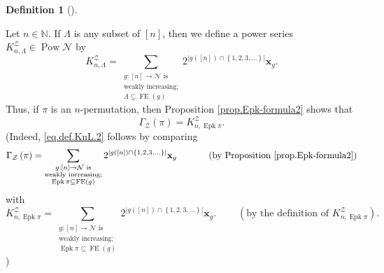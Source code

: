 \documentclass[numbers=enddot,12pt,final,onecolumn,notitlepage]{scrartcl}%
\theoremstyle{definition}
\newtheorem{defi}[theo]{Definition}
\newenvironment{definition}[1][]
{\begin{defi}[#1]\begin{leftbar}}
{\end{leftbar}\end{defi}}
\newenvironment{verlong}{}{}
\let\sumnonlimits\sum
\renewcommand{\sum}{\sumnonlimits\limits}
\begin{document}
\begin{definition}
\label{def.KnL}Let $n\in\mathbb{N}$. If $\Lambda$ is any subset of $\left[
n\right]  $, then we define a power series $K_{n,\Lambda}^{\mathcal{Z}}%
\in\operatorname*{Pow}\mathcal{N}$ by%
\begin{equation}
K_{n,\Lambda}^{\mathcal{Z}}=\sum_{\substack{g:\left[  n\right]  \rightarrow
\mathcal{N}\text{ is}\\\text{weakly increasing;}\\\Lambda\subseteq
\operatorname*{FE}\left(  g\right)  }}2^{\left\vert g\left(  \left[  n\right]
\right)  \cap\left\{  1,2,3,\ldots\right\}  \right\vert }\mathbf{x}_{g}.
\label{eq.def.KnL.1}%
\end{equation}
Thus, if $\pi$ is an $n$-permutation, then
Proposition \ref{prop.Epk-formula2} shows that
\begin{equation}
\Gamma_{\mathcal{Z}}\left(  \pi\right)
=K_{n, \operatorname{Epk} \pi}^{\mathcal{Z}}.
\label{eq.def.KnL.2}%
\end{equation}
\begin{verlong}
(Indeed, \eqref{eq.def.KnL.2} follows by comparing
\[
\Gamma_{\mathcal{Z}}\left(  \pi\right)  =\sum_{\substack{g:\left[  n\right]
\rightarrow\mathcal{N}\text{ is}\\\text{weakly increasing;}%
\\\operatorname{Epk}\pi\subseteq\operatorname*{FE}\left(  g\right)
}}2^{\left\vert g\left(  \left[  n\right]  \right)  \cap\left\{
1,2,3,\ldots\right\}  \right\vert }\mathbf{x}_{g}
\ \ \ \ \ \ \ \ \ \ \left(\text{by Proposition \ref{prop.Epk-formula2}}\right)
\]
with
\[
K_{n,\operatorname{Epk}\pi}^{\mathcal{Z}}=\sum_{\substack{g:\left[  n\right]  \rightarrow
\mathcal{N}\text{ is}\\\text{weakly increasing;}\\\operatorname{Epk}\pi\subseteq
\operatorname*{FE}\left(  g\right)  }}2^{\left\vert g\left(  \left[  n\right]
\right)  \cap\left\{  1,2,3,\ldots\right\}  \right\vert }\mathbf{x}_{g}.
\ \ \ \ \ \ \ \ \ \ \left(\text{by the definition of } K_{n,\operatorname{Epk}\pi}^{\mathcal{Z}}\right)
.
\]
)
\end{verlong}
\end{definition}
\end{document}
